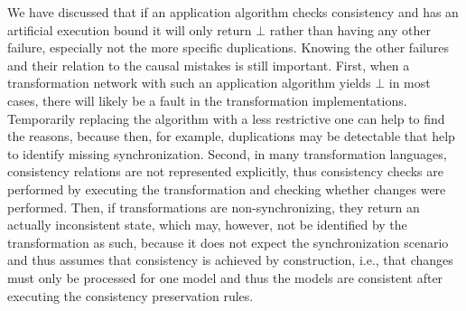 We have discussed that if an application algorithm checks consistency and has an artificial execution bound it will only return $\bot$ rather than having any other failure, especially not the more specific duplications. Knowing the other failures and their relation to the causal mistakes is still important.
First, when a transformation network with such an application algorithm yields $\bot$ in most cases, there will likely be a fault in the transformation implementations.
Temporarily replacing the algorithm with a less restrictive one can help to find the reasons, because then, for example, duplications may be detectable that help to identify missing synchronization.
Second, in many transformation languages, consistency relations are not represented explicitly, thus consistency checks are performed by executing the transformation and checking whether changes were performed.
Then, if transformations are non-synchronizing, they return an actually inconsistent state, which may, however, not be identified by the transformation as such, because it does not expect the synchronization scenario and thus assumes that consistency is achieved by construction, i.e., that changes must only be processed for one model and thus the models are consistent after executing the consistency preservation rules.



